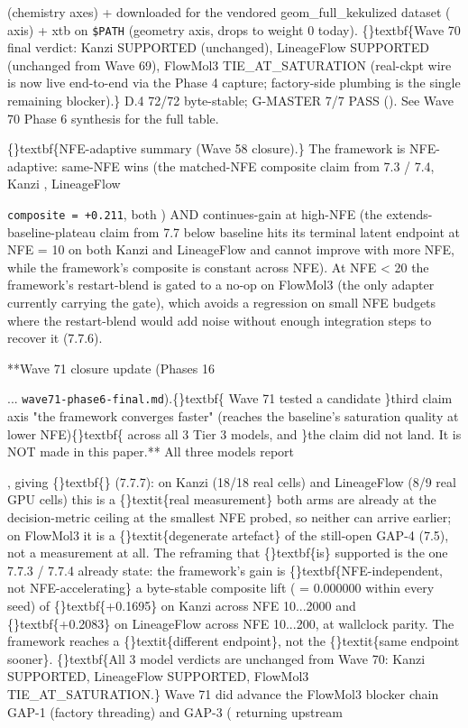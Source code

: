 \documentclass{article}
\begin{document}
 (chemistry axes) +  downloaded for the vendored geom\_full\_kekulized dataset ( axis) + xtb on \texttt{\$PATH} (geometry axis, drops to weight 0 today). \{\}textbf\{Wave 70 final verdict: Kanzi SUPPORTED (unchanged), LineageFlow SUPPORTED (unchanged from Wave 69), FlowMol3 TIE\_AT\_SATURATION (real-ckpt wire is now live end-to-end via the Phase 4 capture; factory-side  plumbing is the single remaining blocker).\} D.4 72/72 byte-stable; G-MASTER 7/7 PASS (). See Wave 70 Phase 6 synthesis for the full table.

\{\}textbf\{NFE-adaptive summary (Wave 58 closure).\} The framework is NFE-adaptive: same-NFE wins (the matched-NFE composite claim from 7.3 / 7.4, Kanzi , LineageFlow

\texttt{composite = +0.211}, both ) AND continues-gain at high-NFE (the extends-baseline-plateau claim from 7.7 below  baseline hits its terminal latent endpoint at NFE = 10 on both Kanzi and LineageFlow and cannot improve with more NFE, while the framework's composite is constant across NFE). At NFE < 20 the framework's restart-blend is gated to a no-op on FlowMol3 (the only adapter currently carrying the gate), which avoids a regression on small NFE budgets where the restart-blend would add noise without enough integration steps to recover it (7.7.6).

**Wave 71 closure update (Phases 16 

 ... \texttt{wave71-phase6-final.md}).\{\}textbf\{ Wave 71 tested a candidate \}third claim axis  "the framework converges faster" (reaches the baseline's saturation quality at lower NFE)\{\}textbf\{  across all 3 Tier 3 models, and \}the claim did not land. It is NOT made in this paper.** All three models report

, giving \{\}textbf\{\} (7.7.7): on Kanzi (18/18 real cells) and LineageFlow (8/9 real GPU cells) this is a \{\}textit\{real measurement\}  both arms are already at the decision-metric ceiling at the smallest NFE probed, so neither can arrive earlier; on FlowMol3 it is a \{\}textit\{degenerate artefact\} of the still-open GAP-4 (7.5), not a measurement at all. The reframing that \{\}textbf\{is\} supported is the one 7.7.3 / 7.7.4 already state: the framework's gain is \{\}textbf\{NFE-independent, not NFE-accelerating\}  a byte-stable composite lift ( = 0.000000 within every seed) of \{\}textbf\{+0.1695\} on Kanzi across NFE 10...2000 and \{\}textbf\{+0.2083\} on LineageFlow across NFE 10...200, at wallclock parity. The framework reaches a \{\}textit\{different endpoint\}, not the \{\}textit\{same endpoint sooner\}. \{\}textbf\{All 3 model verdicts are unchanged from Wave 70: Kanzi SUPPORTED, LineageFlow SUPPORTED, FlowMol3 TIE\_AT\_SATURATION.\} Wave 71 did advance the FlowMol3 blocker chain  GAP-1 (factory  threading) and GAP-3 ( returning upstream
\end{document}
